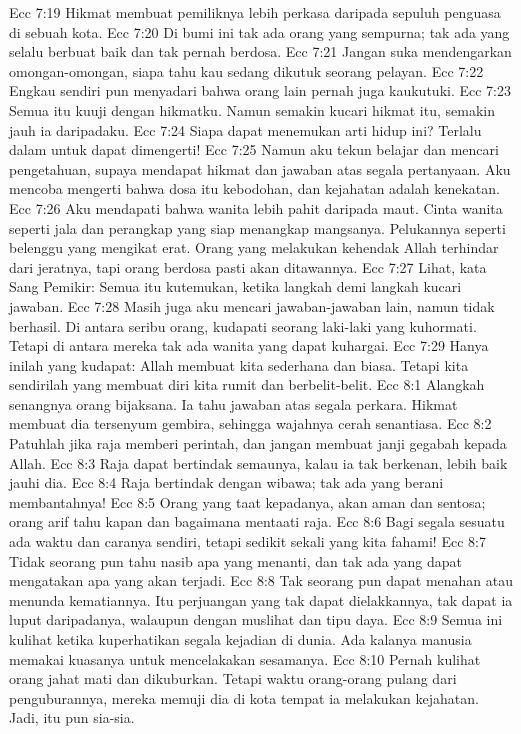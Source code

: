 Ecc 7:19  Hikmat membuat pemiliknya lebih perkasa daripada sepuluh penguasa di sebuah kota.
Ecc 7:20  Di bumi ini tak ada orang yang sempurna; tak ada yang selalu berbuat baik dan tak pernah berdosa.
Ecc 7:21  Jangan suka mendengarkan omongan-omongan, siapa tahu kau sedang dikutuk seorang pelayan.
Ecc 7:22  Engkau sendiri pun menyadari bahwa orang lain pernah juga kaukutuki.
Ecc 7:23  Semua itu kuuji dengan hikmatku. Namun semakin kucari hikmat itu, semakin jauh ia daripadaku.
Ecc 7:24  Siapa dapat menemukan arti hidup ini? Terlalu dalam untuk dapat dimengerti!
Ecc 7:25  Namun aku tekun belajar dan mencari pengetahuan, supaya mendapat hikmat dan jawaban atas segala pertanyaan. Aku mencoba mengerti bahwa dosa itu kebodohan, dan kejahatan adalah kenekatan.
Ecc 7:26  Aku mendapati bahwa wanita lebih pahit daripada maut. Cinta wanita seperti jala dan perangkap yang siap menangkap mangsanya. Pelukannya seperti belenggu yang mengikat erat. Orang yang melakukan kehendak Allah terhindar dari jeratnya, tapi orang berdosa pasti akan ditawannya.
Ecc 7:27  Lihat, kata Sang Pemikir: Semua itu kutemukan, ketika langkah demi langkah kucari jawaban.
Ecc 7:28  Masih juga aku mencari jawaban-jawaban lain, namun tidak berhasil. Di antara seribu orang, kudapati seorang laki-laki yang kuhormati. Tetapi di antara mereka tak ada wanita yang dapat kuhargai.
Ecc 7:29  Hanya inilah yang kudapat: Allah membuat kita sederhana dan biasa. Tetapi kita sendirilah yang membuat diri kita rumit dan berbelit-belit.
Ecc 8:1  Alangkah senangnya orang bijaksana. Ia tahu jawaban atas segala perkara. Hikmat membuat dia tersenyum gembira, sehingga wajahnya cerah senantiasa.
Ecc 8:2  Patuhlah jika raja memberi perintah, dan jangan membuat janji gegabah kepada Allah.
Ecc 8:3  Raja dapat bertindak semaunya, kalau ia tak berkenan, lebih baik jauhi dia.
Ecc 8:4  Raja bertindak dengan wibawa; tak ada yang berani membantahnya!
Ecc 8:5  Orang yang taat kepadanya, akan aman dan sentosa; orang arif tahu kapan dan bagaimana mentaati raja.
Ecc 8:6  Bagi segala sesuatu ada waktu dan caranya sendiri, tetapi sedikit sekali yang kita fahami!
Ecc 8:7  Tidak seorang pun tahu nasib apa yang menanti, dan tak ada yang dapat mengatakan apa yang akan terjadi.
Ecc 8:8  Tak seorang pun dapat menahan atau menunda kematiannya. Itu perjuangan yang tak dapat dielakkannya, tak dapat ia luput daripadanya, walaupun dengan muslihat dan tipu daya.
Ecc 8:9  Semua ini kulihat ketika kuperhatikan segala kejadian di dunia. Ada kalanya manusia memakai kuasanya untuk mencelakakan sesamanya.
Ecc 8:10  Pernah kulihat orang jahat mati dan dikuburkan. Tetapi waktu orang-orang pulang dari penguburannya, mereka memuji dia di kota tempat ia melakukan kejahatan. Jadi, itu pun sia-sia.
